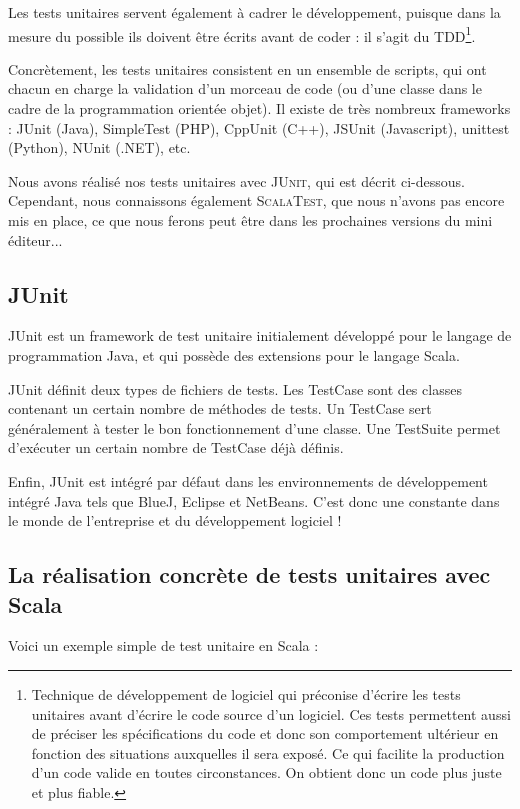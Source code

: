 \documentclass[a4paper,11pt]{article}
\begin{document}
Les tests unitaires servent également à cadrer le développement, puisque dans la mesure du possible ils doivent être écrits avant de coder : il s'agit du TDD\footnote{Technique de développement de logiciel qui préconise d'écrire les tests unitaires avant d'écrire le code source d'un logiciel. Ces tests permettent aussi de préciser les spécifications du code et donc son comportement ultérieur en fonction des situations auxquelles il sera exposé. Ce qui facilite la production d'un code valide en toutes circonstances. On obtient donc un code plus juste et plus fiable.}.

Concrètement, les tests unitaires consistent en un ensemble de scripts, qui ont chacun en charge la validation d'un morceau de code (ou d'une classe dans le cadre de la programmation orientée objet). Il existe de très nombreux frameworks : JUnit (Java), SimpleTest (PHP), CppUnit (C++), JSUnit (Javascript), unittest (Python), NUnit (.NET), etc.

Nous avons réalisé nos tests unitaires avec \textsc{JUnit}, qui est décrit ci-dessous. Cependant, nous connaissons également \textsc{ScalaTest}, que nous n'avons pas encore mis en place, ce que nous ferons peut être dans les prochaines versions du mini éditeur...

\subsection{JUnit}

JUnit est un framework de test unitaire initialement développé pour le langage de programmation Java, et qui possède des extensions pour le langage Scala.

JUnit définit deux types de fichiers de tests. Les TestCase sont des classes contenant un certain nombre de méthodes de tests. Un TestCase sert généralement à tester le bon fonctionnement d'une classe. Une TestSuite permet d'exécuter un certain nombre de TestCase déjà définis.

Enfin, JUnit est intégré par défaut dans les environnements de développement intégré Java tels que BlueJ, Eclipse et NetBeans. C'est donc une constante dans le monde de l'entreprise et du développement logiciel !


\subsection{La réalisation concrète de tests unitaires avec Scala}

Voici un exemple simple de test unitaire en Scala :
\end{document}

